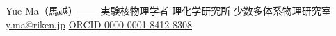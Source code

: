 \documentclass[a4paper,11pt,fontset=none]{ctexart}
\begin{document}
  {Yue Ma（馬越）—— 実験核物理学者}
  {理化学研究所 少数多体系物理研究室 \quad\textbar\quad \href{mailto:y.ma@riken.jp}{y.ma@riken.jp} \quad\textbar\quad \href{https://orcid.org/0000-0001-8412-8308}{ORCID 0000-0001-8412-8308}}


\end{document}
